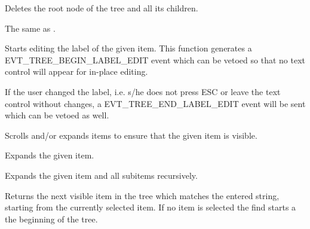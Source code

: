 
Deletes the root node of the tree and all its children.

\label{wxtreelistctrledit}


The same as .

\label{wxtreelistctrleditlabel}


Starts editing the label of the given item. This function generates a
EVT\_TREE\_BEGIN\_LABEL\_EDIT event which can be vetoed so that no
text control will appear for in-place editing.

If the user changed the label, i.e. s/he does not press ESC or leave
the text control without changes, a EVT\_TREE\_END\_LABEL\_EDIT event
will be sent which can be vetoed as well.



\label{wxtreelistctrlensurevisible}


Scrolls and/or expands items to ensure that the given item is visible.

\label{wxtreelistctrlexpand}


Expands the given item.

\label{wxtreelistctrlexpandall}


Expands the given item and all subitems recursively.

\label{wxtreelistctrlfinditem}


Returns the next visible item in the tree which matches the entered string, starting from 
the currently selected item. If no item is selected the find starts a the beginning of the 
tree.

